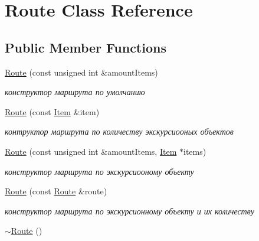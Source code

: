 \hypertarget{class_route}{}\section{Route Class Reference}
\label{class_route}
\subsection*{Public Member Functions}
\begin{DoxyCompactItemize}
\item 
\hypertarget{class_route_ad5f4fe1d852768a60246dae8a4862699}{}\hyperlink{class_route_ad5f4fe1d852768a60246dae8a4862699}{Route} (const unsigned int \&amount\+Items)\label{class_route_ad5f4fe1d852768a60246dae8a4862699}

\begin{DoxyCompactList}\small\item\em конструктор маршрута по умолчанию \end{DoxyCompactList}\item 
\hypertarget{class_route_a0f5d78e43214bafb3d973bae07381f58}{}\hyperlink{class_route_a0f5d78e43214bafb3d973bae07381f58}{Route} (const \hyperlink{class_item}{Item} \&item)\label{class_route_a0f5d78e43214bafb3d973bae07381f58}

\begin{DoxyCompactList}\small\item\em контруктор маршрута по количеству экскурсиооных объектов \end{DoxyCompactList}\item 
\hypertarget{class_route_a4d2d48d0fc726775b1f5309a56a8ceef}{}\hyperlink{class_route_a4d2d48d0fc726775b1f5309a56a8ceef}{Route} (const unsigned int \&amount\+Items, \hyperlink{class_item}{Item} $\ast$items)\label{class_route_a4d2d48d0fc726775b1f5309a56a8ceef}

\begin{DoxyCompactList}\small\item\em конструктор маршрута по экскурсиооному объекту \end{DoxyCompactList}\item 
\hypertarget{class_route_a12e053892cff175232b9df34b8bb9d0c}{}\hyperlink{class_route_a12e053892cff175232b9df34b8bb9d0c}{Route} (const \hyperlink{class_route}{Route} \&route)\label{class_route_a12e053892cff175232b9df34b8bb9d0c}

\begin{DoxyCompactList}\small\item\em конструктор маршрута по экскурсионному объекту и их количеству \end{DoxyCompactList}\item 
\hypertarget{class_route_a41212532f2bce3298d8f9468f82c62ab}{}\hyperlink{class_route_a41212532f2bce3298d8f9468f82c62ab}{$\sim$\+Route} ()\label{class_route_a41212532f2bce3298d8f9468f82c62ab}


\end{DoxyCompactItemize}
